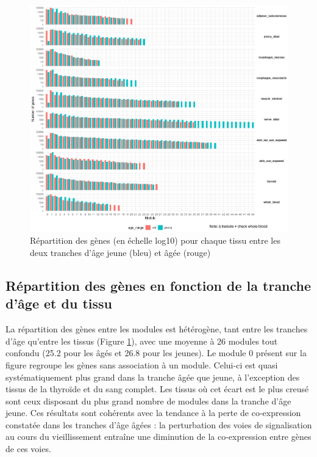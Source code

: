\begin{figure}[!hb]
    \centering
    \includegraphics[width=1\textwidth]{img/chap2/chap2_repartition_genes_modules_tissus.png}
    \caption{Répartition des gènes (en échelle log10) pour chaque tissu entre les deux tranches d'âge jeune (bleu) et âgée (rouge)}
    \label{figure:repartition_genes_modules_tissus}
\end{figure}

\subsection{Répartition des gènes en fonction de la tranche d'âge et du tissu}

La répartition des gènes entre les modules est hétérogène, tant entre les tranches d'âge qu'entre les tissus (Figure \ref{figure:repartition_genes_modules_tissus}), avec une moyenne à 26 modules tout confondu (25.2 pour les âgés et 26.8 pour les jeunes). Le module 0 présent sur la figure regroupe les gènes sans association à un module. Celui-ci est quasi systématiquement plus grand dans la tranche âgée que jeune, à l'exception des tissus de la thyroïde et du sang complet. Les tissus où cet écart est le plus creusé sont ceux disposant du plus grand nombre de modules dans la tranche d'âge jeune. Ces résultats sont cohérents avec la tendance à la perte de co-expression constatée dans les tranches d'âge âgées  : la perturbation des voies de signalisation au cours du vieillissement entraîne une diminution de la co-expression entre gènes de ces voies.

